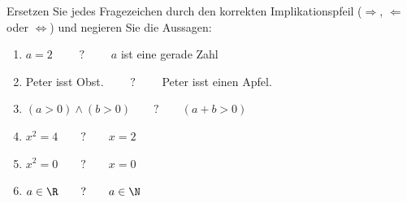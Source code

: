 \begin{ExerciseBlock}
Ersetzen Sie jedes Fragezeichen durch den korrekten Implikationspfeil ($\Rightarrow$, $\Leftarrow$ oder $\Leftrightarrow$) und negieren Sie die Aussagen:
\begin{enumerate}[label=\alph*)]
	\item $\displaystyle a = 2$ $\qquad ? \qquad$ $a$ ist eine gerade Zahl
	\item Peter isst Obst. $\qquad ? \qquad$ Peter isst einen Apfel.
	\item $\displaystyle(a > 0) \wedge (b > 0) \qquad ? \qquad (a + b > 0)$
	\item $\displaystyle x^2=4 \qquad ? \qquad x=2$
	\item $\displaystyle x^2=0 \qquad ? \qquad x=0$
	\item $\displaystyle a \in \R \qquad ? \qquad a \in \N$
\end{enumerate}

\end{ExerciseBlock}
